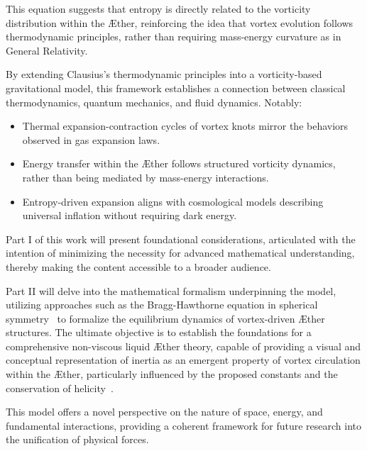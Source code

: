 This equation suggests that entropy is directly related to the vorticity distribution within the Æther, reinforcing the idea that vortex evolution follows thermodynamic principles, rather than requiring mass-energy curvature as in General Relativity.

By extending Clausius’s thermodynamic principles into a vorticity-based gravitational model, this framework establishes a connection between classical thermodynamics, quantum mechanics, and fluid dynamics. Notably:

\begin{itemize}
    \item Thermal expansion-contraction cycles of vortex knots mirror the behaviors observed in gas expansion laws.
    \item Energy transfer within the Æther follows structured vorticity dynamics, rather than being mediated by mass-energy interactions.
    \item Entropy-driven expansion aligns with cosmological models describing universal inflation without requiring dark energy.
\end{itemize}

Part I of this work will present foundational considerations, articulated with the intention of minimizing the necessity for advanced mathematical understanding, thereby making the content accessible to a broader audience.

Part II will delve into the mathematical formalism underpinning the model, utilizing approaches such as the Bragg-Hawthorne equation in spherical symmetry~\cite{keller2024} to formalize the equilibrium dynamics of vortex-driven Æther structures.
The ultimate objective is to establish the foundations for a comprehensive non-viscous liquid Æther theory, capable of providing a visual and conceptual representation of inertia as an emergent property of vortex circulation within the Æther, particularly influenced by the proposed constants and the conservation of helicity~\cite{kleckner2016}.

This model offers a novel perspective on the nature of space, energy, and fundamental interactions, providing a coherent framework for future research into the unification of physical forces.